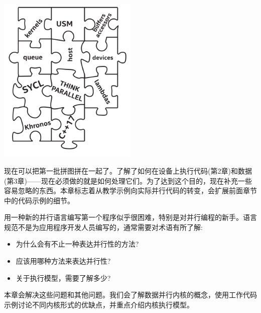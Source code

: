 \begin{center}
	\includegraphics[width=0.5\textwidth]{content/chapter-4/images/1}
\end{center}

现在可以把第一批拼图拼在一起了。了解了如何在设备上执行代码(第2章)和数据(第3章)——现在必须做的就是如何处理它们。为了达到这个目的，现在补充一些容易忽略的东西。本章标志着从教学示例向实际并行代码的转变，会扩展前面章节中的代码示例的细节。\par

用一种新的并行语言编写第一个程序似乎很困难，特别是对并行编程的新手。语言规范不是为应用程序开发人员编写的，通常需要对术语有所了解:\par

\begin{itemize}
	\item 为什么会有不止一种表达并行性的方法?
	\item 应该用哪种方法来表达并行性?
	\item 关于执行模型，需要了解多少?
\end{itemize}

本章会解决这些问题和其他问题。我们会了解数据并行内核的概念，使用工作代码示例讨论不同内核形式的优缺点，并重点介绍内核执行模型。\par








